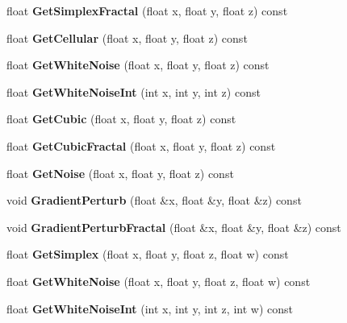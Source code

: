 \begin{DoxyCompactItemize}
float {\bfseries Get\+Simplex\+Fractal} (float x, float y, float z) const
\item 
\mbox{\label{class_flounder_1_1_noise_fast_ac2e2c401b42628be6f77706279d19f00}} 
float {\bfseries Get\+Cellular} (float x, float y, float z) const
\item 
\mbox{\label{class_flounder_1_1_noise_fast_a1a4548e90779ca7d7a1521ce3e04b901}} 
float {\bfseries Get\+White\+Noise} (float x, float y, float z) const
\item 
\mbox{\label{class_flounder_1_1_noise_fast_ab07dfdcc5390b2f25de59b6d55662c92}} 
float {\bfseries Get\+White\+Noise\+Int} (int x, int y, int z) const
\item 
\mbox{\label{class_flounder_1_1_noise_fast_a20f8e4886922738f17e08900a5f23d74}} 
float {\bfseries Get\+Cubic} (float x, float y, float z) const
\item 
\mbox{\label{class_flounder_1_1_noise_fast_a1ca9e89d5796a03206c94d8613e34f80}} 
float {\bfseries Get\+Cubic\+Fractal} (float x, float y, float z) const
\item 
\mbox{\label{class_flounder_1_1_noise_fast_a93d9ccf0b5b92d9dc26331d222136520}} 
float {\bfseries Get\+Noise} (float x, float y, float z) const
\item 
\mbox{\label{class_flounder_1_1_noise_fast_a9d4c921ace0600b5439518760c43bec7}} 
void {\bfseries Gradient\+Perturb} (float \&x, float \&y, float \&z) const
\item 
\mbox{\label{class_flounder_1_1_noise_fast_a1a63634e9c51101eeb7bd69cf0d1fd08}} 
void {\bfseries Gradient\+Perturb\+Fractal} (float \&x, float \&y, float \&z) const
\item 
\mbox{\label{class_flounder_1_1_noise_fast_a9883c200295eeb5005599d97fcfe75bd}} 
float {\bfseries Get\+Simplex} (float x, float y, float z, float w) const
\item 
\mbox{\label{class_flounder_1_1_noise_fast_acbd5f96012d507b126e3646a2ae914cf}} 
float {\bfseries Get\+White\+Noise} (float x, float y, float z, float w) const
\item 
\mbox{\label{class_flounder_1_1_noise_fast_aedf45396b5432c4571950bb5ce578fdf}} 
float {\bfseries Get\+White\+Noise\+Int} (int x, int y, int z, int w) const
\end{DoxyCompactItemize}
